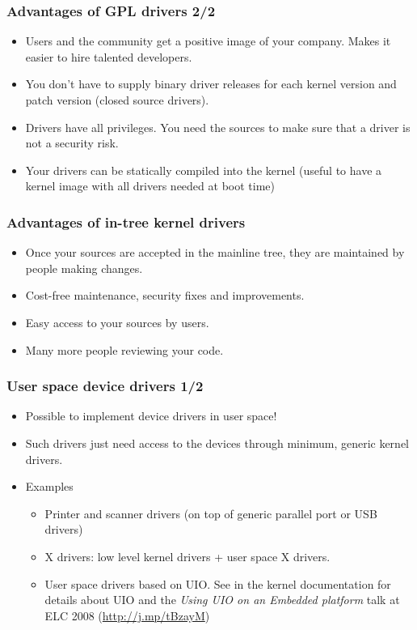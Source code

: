 \begin{frame}
  \frametitle{Advantages of GPL drivers 2/2}
  \begin{itemize}
  \item Users and the community get a positive image of your
    company. Makes it easier to hire talented developers.
  \item You don't have to supply binary driver releases for each
    kernel version and patch version (closed source drivers).
  \item Drivers have all privileges. You need the sources to make sure
    that a driver is not a security risk.
  \item Your drivers can be statically compiled into the kernel
    (useful to have a kernel image with all drivers needed at boot time)
  \end{itemize}
\end{frame}

\begin{frame}
  \frametitle{Advantages of in-tree kernel drivers}
  \begin{itemize}
  \item Once your sources are accepted in the mainline tree, they are
    maintained by people making changes.
  \item Cost-free maintenance, security fixes and improvements.
  \item Easy access to your sources by users.
  \item Many more people reviewing your code.
  \end{itemize}
\end{frame}

\begin{frame}
  \frametitle{User space device drivers 1/2}
  \begin{itemize}
  \item Possible to implement device drivers in user space!
  \item Such drivers just need access to the devices through minimum,
    generic kernel drivers.
  \item Examples
    \begin{itemize}
    \item Printer and scanner drivers (on top of generic parallel port
      or USB drivers)
    \item X drivers: low level kernel drivers + user space X drivers.
    \item User space drivers based on UIO. See 
      in the kernel documentation for details about UIO and the \emph{Using UIO on
        an Embedded platform} talk at ELC 2008
        (\url{http://j.mp/tBzayM})
    \end{itemize}
  \end{itemize}
\end{frame}

